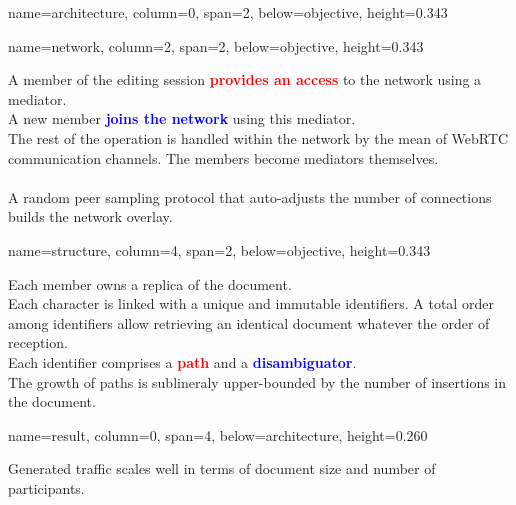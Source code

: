 \documentclass[a1paper, fontscale=0.4, portrait]{baposter}
\newcommand{\RED}[1]{\textcolor{red}{\textbf{#1}}}
\newcommand{\BLUE}[1]{\textcolor{blue}{\textbf{#1}}}
\newcommand{\SECONDROW}{0.343}
\newcommand{\THIRDROW}{0.260}
\begin{document}
\begin{poster}
{%
  }

  {name=architecture, column=0, span=2, below=objective, height=\SECONDROW}{
    \begin{center}
      
    \end{center}
  }
  
  {name=network, column=2, span=2, below=objective, height=\SECONDROW}{
    \begin{center}
            
    \end{center}
    A member of the editing session \RED{provides an access} to the network using
    a mediator. \\
    A new member \BLUE{joins the network} using this mediator. \\
    The rest of the operation is handled within the network by the mean of
    WebRTC communication channels. The members become mediators themselves.\\
    \\
    A random peer sampling protocol that auto-adjusts the number of connections
    builds the network overlay.

  }

  {name=structure, column=4, span=2, below=objective, height=\SECONDROW}{
    \begin{center}
      
    \end{center}
    Each member owns a replica of the document.\\
    Each character is linked with a unique and immutable identifiers. A total
    order among identifiers allow retrieving an identical document whatever the
    order of reception.\\
    Each identifier comprises a \RED{path} and a \BLUE{disambiguator}. \\
    The growth of paths is sublineraly upper-bounded by the number of insertions in
    the document.   
}

  {name=result, column=0, span=4, below=architecture, height=\THIRDROW}{
    \begin{minipage}[c]{.5\linewidth}
      Generated traffic scales well in terms of document size and number of
      participants.\\
                  

\end{minipage}}
\end{poster}
\end{document}
